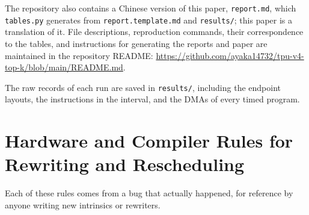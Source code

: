 \documentclass[sigconf,nonacm,balance=false]{acmart}
\newcommand{\code}[1]{\texttt{#1}}
\begin{document}
The repository also contains a Chinese version of this paper, \code{report.\allowbreak{}md}, which \code{tables.\allowbreak{}py} generates from \code{report.\allowbreak{}template.\allowbreak{}md} and \code{results/\allowbreak{}}; this paper is a translation of it. File descriptions, reproduction commands, their correspondence to the tables, and instructions for generating the reports and paper are maintained in the repository README: \url{https://github.com/ayaka14732/tpu-v4-top-k/blob/main/README.md}.

The raw records of each run are saved in \code{results/\allowbreak{}}, including the endpoint layouts, the instructions in the interval, and the DMAs of every timed program.

\section{Hardware and Compiler Rules for Rewriting and Rescheduling}
\label{sec:B}

Each of these rules comes from a bug that actually happened, for reference by anyone writing new intrinsics or rewriters.
\end{document}
